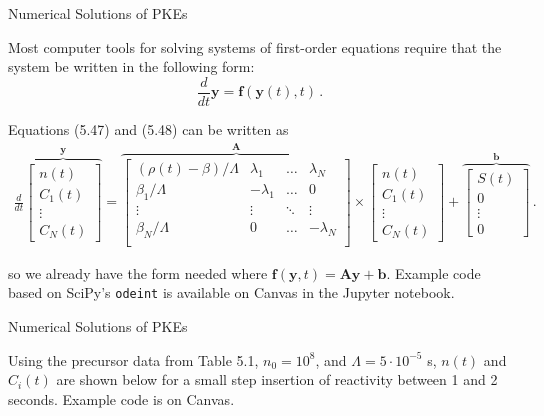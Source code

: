 \documentclass[aspectratio=1610]{beamer}
\begin{document}
\begin{frame}[fragile]{Numerical Solutions of PKEs}

Most computer tools for solving systems of first-order equations require that the system be written in the following form:
\begin{equation*}
  \frac{d}{dt} \mathbf{y} = \mathbf{f}(\mathbf{y}(t), t) \, .
\end{equation*}


Equations (5.47) and (5.48) can be written as
{\small
\begin{align*}
 \frac{d}{dt}  
   \overbrace{\left [ \begin{array}{c} n(t) \\ C_1(t) \\  \vdots \\ C_N(t) \end{array} \right ]}^{\mathbf{y}}
 =
   \overbrace{\left [ \begin{array}{cccc}
       (\rho(t)-\beta)/\Lambda        & \lambda_1 & \ldots & \lambda_N \\
       \beta_1 /\Lambda  & -\lambda_1 & \ldots & 0        \\
                             \vdots & \vdots & \ddots & \vdots        \\
       \beta_N /\Lambda  & 0 & \ldots & -\lambda_N \\
   \end{array} \right ]}^{\mathbf{A}} \times
   \left [ \begin{array}{c} n(t) \\ C_1(t) \\  \vdots \\ C_N(t) \end{array} \right ] +
   \overbrace{\left [ \begin{array}{c} S(t) \\ 0 \\  \vdots \\ 0 \end{array} \right ]}^{\mathbf{b}} \, .
\end{align*}
}

so we already have the form needed where $\mathbf{f}(\mathbf{y},t) = \mathbf{A}\mathbf{y}+\mathbf{b}$.  Example code based on SciPy's {\tt odeint} is available on Canvas in the Jupyter notebook.


\end{frame}


\begin{frame}[fragile]{Numerical Solutions of PKEs}

Using the precursor data from Table 5.1, $n_0 = 10^{8}$, and $\Lambda = 5\cdot 10^{-5}$ s, $n(t)$ and $C_i(t)$ are shown below for a small step insertion of reactivity between 1 and 2 seconds.  Example code is on Canvas.

\resizebox{0.95\textwidth}{!}{}

\end{frame}
\end{document}
